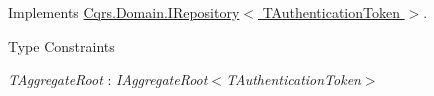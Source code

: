 Implements \hyperlink{interfaceCqrs_1_1Domain_1_1IRepository_a6086f15a0fef4982da553d24aee04015_a6086f15a0fef4982da553d24aee04015}{Cqrs.\+Domain.\+I\+Repository$<$ T\+Authentication\+Token $>$}.

\begin{Desc}
\item[Type Constraints]\begin{description}
\item[{\em T\+Aggregate\+Root} : {\em I\+Aggregate\+Root$<$T\+Authentication\+Token$>$}]\end{description}
\end{Desc}
